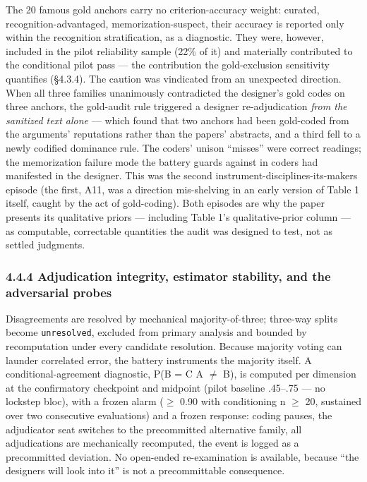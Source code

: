 The 20 famous gold anchors carry no criterion-accuracy weight: curated, recognition-advantaged, memorization-suspect, their accuracy is reported only within the recognition stratification, as a diagnostic. They were, however, included in the pilot reliability sample (22\% of it) and materially contributed to the conditional pilot pass --- the contribution the gold-exclusion sensitivity quantifies (\S{}4.3.4). The caution was vindicated from an unexpected direction. When all three families unanimously contradicted the designer's gold codes on three anchors, the gold-audit rule triggered a designer re-adjudication \emph{from the sanitized text alone} --- which found that two anchors had been gold-coded from the arguments' reputations rather than the papers' abstracts, and a third fell to a newly codified dominance rule. The coders' unison ``misses'' were correct readings; the memorization failure mode the battery guards against in coders had manifested in the designer. This was the second instrument-disciplines-its-makers episode (the first, A11, was a direction mis-shelving in an early version of Table 1 itself, caught by the act of gold-coding). Both episodes are why the paper presents its qualitative priors --- including Table 1's qualitative-prior column --- as computable, correctable quantities the audit was designed to test, not as settled judgments.

\subsubsection{4.4.4 Adjudication integrity, estimator stability, and the adversarial probes}\label{adjudication-integrity-estimator-stability-and-the-adversarial-probes}

Disagreements are resolved by mechanical majority-of-three; three-way splits become \texttt{unresolved}, excluded from primary analysis and bounded by recomputation under every candidate resolution. Because majority voting can launder correlated error, the battery instruments the majority itself. A conditional-agreement diagnostic, P(B = C \textbar{} A $\ne$ B), is computed per dimension at the confirmatory checkpoint and midpoint (pilot baseline .45--.75 --- no lockstep bloc), with a frozen alarm ($\ge$ 0.90 with conditioning n $\ge$ 20, sustained over two consecutive evaluations) and a frozen response: coding pauses, the adjudicator seat switches to the precommitted alternative family, all adjudications are mechanically recomputed, the event is logged as a precommitted deviation. No open-ended re-examination is available, because ``the designers will look into it'' is not a precommittable consequence.

